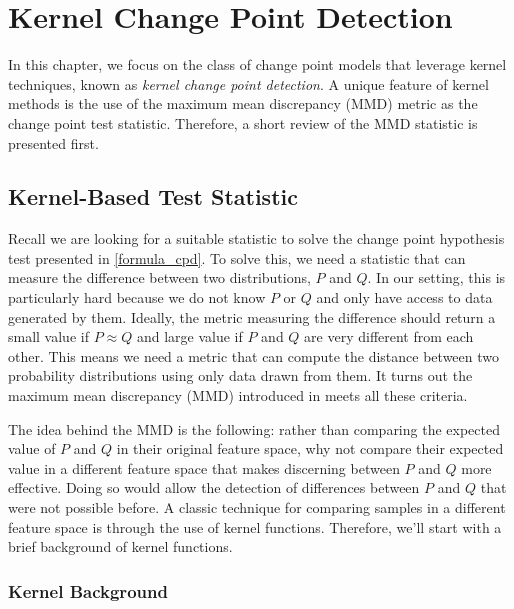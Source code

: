 \chapter{Kernel Change Point Detection}
In this chapter, we focus on the class of change point models that leverage kernel techniques, known as \textit{kernel change point detection}. A unique feature of kernel methods is the use of the maximum mean discrepancy (MMD) metric as the change point test statistic. Therefore, a short review of the MMD statistic is presented first.



\section{Kernel-Based Test Statistic}
\label{mmd}
Recall we are looking for a suitable statistic to solve the change point hypothesis test presented in \ref{formula_cpd}. To solve this, we need a statistic that can measure the difference between two distributions, $P$ and $Q$. In our setting, this is particularly hard because we do not know $P$ or $Q$ and only have access to data generated by them. Ideally, the metric measuring the difference should return a small value if $P \approx  Q$ and large value if $P$ and $Q$ are very different from each other. This means we need a metric that can compute the distance between two probability distributions using only data drawn from them. It turns out the maximum mean discrepancy (MMD) introduced in \cite{gretton2012kernel} meets all these criteria.

The idea behind the MMD is the following: rather than comparing the expected value of $P$ and $Q$ in their original feature space, why not compare their expected value in a different feature space that makes discerning between $P$ and $Q$ more effective. Doing so would allow the detection of differences between $P$ and $Q$ that were not possible before. A classic technique for comparing samples in a different feature space is through the use of kernel functions. Therefore, we'll start with a brief background of kernel functions.

\subsection{Kernel Background}

